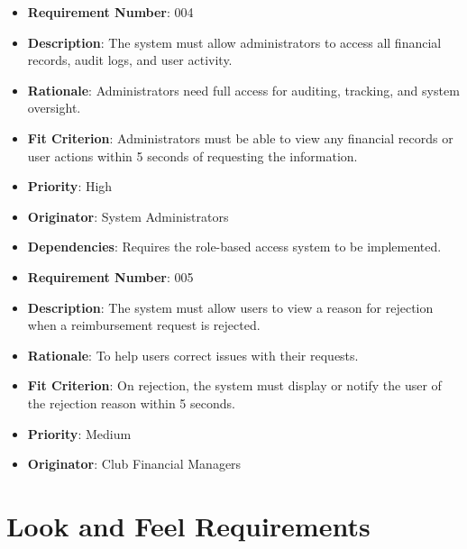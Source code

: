 \documentclass[12pt]{article}
\begin{document}
\begin{itemize}
  \bigskip

  \item \textbf{Requirement Number}: 004
  \item \textbf{Description}: The system must allow administrators to access all financial records, audit logs, and user activity.
  \item \textbf{Rationale}: Administrators need full access for auditing, tracking, and system oversight.
  \item \textbf{Fit Criterion}: Administrators must be able to view any financial records or user actions within 5 seconds of requesting the information.
  \item \textbf{Priority}: High
  \item \textbf{Originator}: System Administrators
  \item \textbf{Dependencies}: Requires the role-based access system to be implemented.
  
  \bigskip
  
  \item \textbf{Requirement Number}: 005
  \item \textbf{Description}: The system must allow users to view a reason for rejection when a reimbursement request is rejected.
  \item \textbf{Rationale}: To help users correct issues with their requests.
  \item \textbf{Fit Criterion}: On rejection, the system must display or notify the user of the rejection reason within 5 seconds.
  \item \textbf{Priority}: Medium
  \item \textbf{Originator}: Club Financial Managers

\end{itemize}

\section{Look and Feel Requirements}
\end{document}
